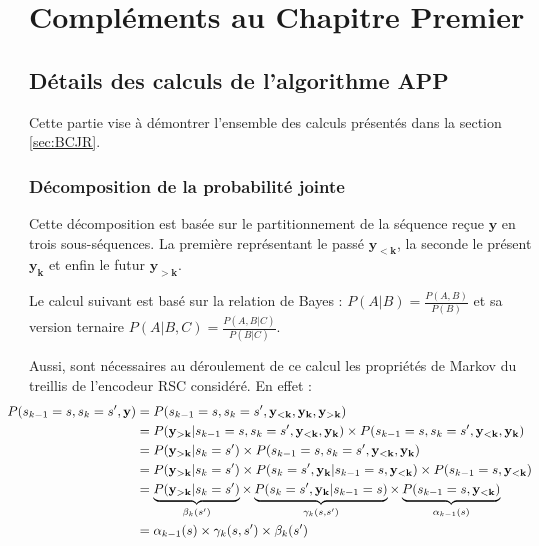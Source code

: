 
\appendix
\chapter{Compléments au Chapitre Premier}
\section{Détails des calculs de l'algorithme APP}\label{append:app}
Cette partie vise à démontrer l'ensemble des calculs présentés dans la section \ref{sec:BCJR}.
\subsection{Décomposition de la probabilité jointe} 
Cette décomposition est basée sur le partitionnement de la séquence reçue $\mathbf{y}$ en trois sous-séquences. La première représentant le passé $ \mathbf{y_{<k}}$, la seconde le présent $\mathbf{y_{k}} $ et enfin le futur $ \mathbf{y_{>k}}$.

Le calcul suivant est basé sur la relation de Bayes : $P(A|B) = \frac{P(A,B)}{P(B)}$ et sa version ternaire $P(A|B,C) = \frac{P(A,B|C)}{P(B|C)}$.

Aussi, sont nécessaires au déroulement de ce calcul les propriétés de Markov du treillis de l'encodeur RSC considéré. En effet :
\begin{align*}
	\hspace*{-4ex}
	P(s_{k-1}=s, s_{k}=s',\mathbf{y}) & = P(s_{k-1}=s, s_{k}=s',\mathbf{y_{<k}},\mathbf{y_{k}},\mathbf{y_{>k}})                                                                                                                             \\
	                                  & = P(\mathbf{y_{>k}}|s_{k-1}=s, s_{k}=s',\mathbf{y_{<k}},\mathbf{y_{k}})\times P(s_{k-1}=s, s_{k}=s',\mathbf{y_{<k}},\mathbf{y_{k}})                                                                 \\
	                                  & =P(\mathbf{y_{>k}}|s_{k}=s')\times P(s_{k-1}=s, s_{k}=s',\mathbf{y_{<k}},\mathbf{y_{k}})                                                                                                            \\
	                                  & =P(\mathbf{y_{>k}}|s_{k}=s')\times P(s_{k}=s',\mathbf{y_{k}}|s_{k-1}=s,\mathbf{y_{<k}})\times P(s_{k-1}=s,\mathbf{y_{<k}})                                                                          \\
	                                  & = \underbrace{P(\mathbf{y_{>k}}|s_{k}=s')}_{\beta_k(s')}\times \underbrace{P(s_{k}=s',\mathbf{y_{k}}|s_{k-1}=s)}_{\gamma_k(s,s')}\times \underbrace{P(s_{k-1}=s,\mathbf{y_{<k}})}_{\alpha_{k-1}(s)} \\
	                                  & = \alpha_{k-1}(s) \times \gamma_k(s,s') \times \beta_k(s')                                                                                                                                          
\end{align*}

